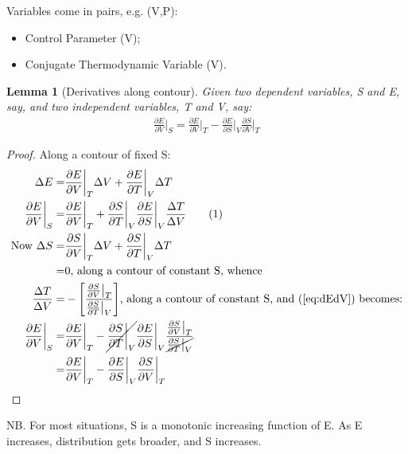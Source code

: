 \documentclass[]{article}
\newcommand\numberthis{\addtocounter{equation}{1}\tag{\theequation}}
\newtheorem{lemma}{Lemma}
\begin{document}
Variables come in pairs, e.g. (V,P):
\begin{itemize}
	\item Control Parameter (V);
	\item Conjugate Thermodynamic Variable (V).
\end{itemize}

\begin{lemma}[Derivatives along contour]\label{thm:derivative:contour}
	Given two dependent variables, S and E, say, and two independent variables, T and V, say:
	\begin{align*}
		\frac{\partial E}{\partial V}\bigg|_S = \frac{\partial E}{\partial V}\bigg|_T - 	\frac{\partial E}{\partial S}\bigg|_V \frac{\partial S}{\partial V}\bigg|_T
	\end{align*}
\end{lemma}
\begin{proof}
	Along a contour of fixed S:
	\begin{align*}
		\Delta E =& \frac{\partial E}{\partial V} \bigg|_T \Delta V + \frac{\partial E}{\partial T} \bigg|_V \Delta T\\
		\frac{\partial E}{\partial V} \bigg|_S=& \frac{\partial E}{\partial V} \bigg|_T  + \frac{\partial S}{\partial T} \bigg|_V \frac{\partial E}{\partial S} \bigg|_V \frac{\Delta T}{\Delta V} \numberthis\label{eq:dEdV}\\
		\text{Now }\Delta S =& \frac{\partial S}{\partial V} \bigg|_T \Delta V + \frac{\partial S}{\partial T} \bigg|_V \Delta T\\
		=& 0\text{, along a contour of constant S, whence}\\
		\frac{\Delta T}{\Delta V} =& - \Bigg[\frac{\frac{\partial S}{\partial V}\big|_T}{\frac{\partial S}{\partial T}\big|_V}\Bigg]\text{, along a contour of constant S, and (\ref{eq:dEdV}) becomes:}\\
		\frac{\partial E}{\partial V} \bigg|_S=& \frac{\partial E}{\partial V} \bigg|_T  - \cancel{\frac{\partial S}{\partial T} \bigg|_V} \frac{\partial E}{\partial S} \bigg|_V \frac{\frac{\partial S}{\partial V}\big|_T}{\cancel{\frac{\partial S}{\partial T}\big|_V}}\\
		=& \frac{\partial E}{\partial V} \bigg|_T  -  \frac{\partial E}{\partial S} \bigg|_V \frac{\partial S}{\partial V}\bigg|_T
	\end{align*}
\end{proof}

NB. For most situations, S is a monotonic increasing function of E. As E increases, distribution gets broader, and S increases. 
\end{document}
